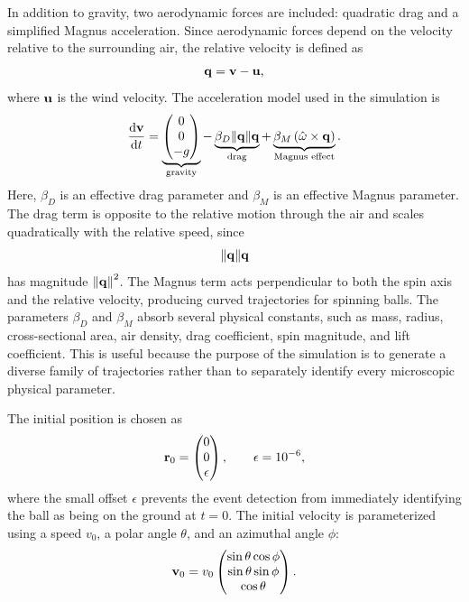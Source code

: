 In addition to gravity, two aerodynamic forces are included: quadratic drag and a simplified Magnus acceleration.
Since aerodynamic forces depend on the velocity relative to the surrounding air, the relative velocity is defined as
\begin{equation*}
    \vb{q} = \vb{v} - \vb{u},
\end{equation*}
where $\vb{u}$ is the wind velocity.
The acceleration model used in the simulation is
\begin{equation}
  \dv{\vb{v}}{t} = \underbrace{
        \begin{pmatrix}
            0 \\ 0 \\ -g
        \end{pmatrix}
    }_{\text{gravity}}
    - \underbrace{
        \beta_D \norm{\vb{q}} \vb{q}
    }_{\text{drag}}
    + \underbrace{
        \beta_M \left( \hat{\vb{\omega}} \times \vb{q} \right)
    }_{\text{Magnus effect}}.
    \label{eq:eom}
\end{equation}
Here, $\beta_D$ is an effective drag parameter and $\beta_M$ is an effective Magnus parameter.
The drag term is opposite to the relative motion through the air and scales quadratically with the relative speed, since
\begin{equation*}
    \norm{\vb{q}} \vb{q}
\end{equation*}
has magnitude $\norm{\vb{q}}^2$.
The Magnus term acts perpendicular to both the spin axis and the relative velocity, producing curved trajectories for spinning balls.\cite{mehta1985aerodynamics}\cite{goff2009trajectory}
The parameters $\beta_D$ and $\beta_M$ absorb several physical constants, such as mass, radius, cross-sectional area, air density, drag coefficient, spin magnitude, and lift coefficient.
This is useful because the purpose of the simulation is to generate a diverse family of trajectories rather than to separately identify every microscopic physical parameter.

The initial position is chosen as
\begin{equation*}
    \vb{r}_0 = \begin{pmatrix}
        0 \\ 0 \\ \epsilon
    \end{pmatrix}, \qquad \epsilon = 10^{-6},
\end{equation*}
where the small offset $\epsilon$ prevents the event detection from immediately identifying the ball as being on the ground at $t=0$.
The initial velocity is parameterized using a speed $v_0$, a polar angle $\theta$, and an azimuthal angle $\phi$:
\begin{equation*}
    \vb{v}_0 = v_0 \begin{pmatrix}
        \sin\theta \cos\phi \\
        \sin\theta \sin\phi \\
        \cos\theta
    \end{pmatrix}.
\end{equation*}

